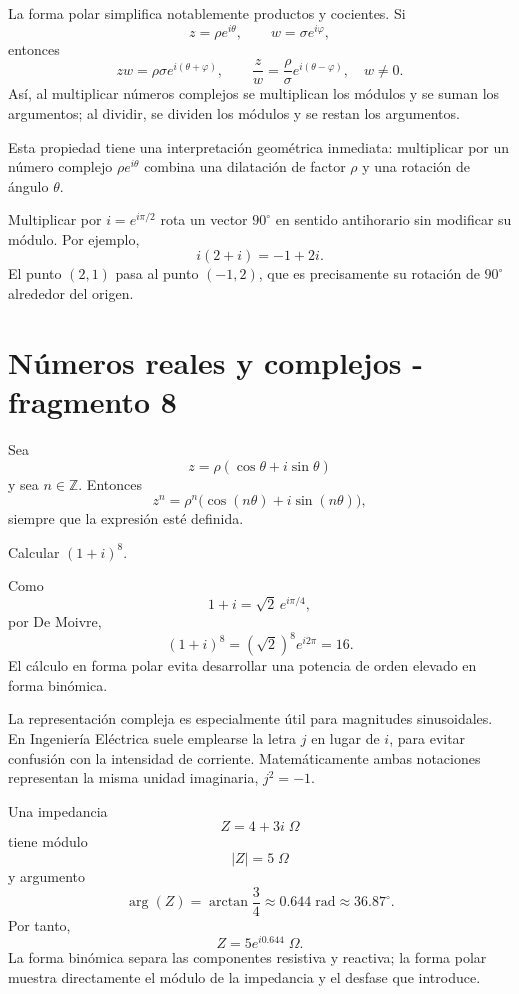 La forma polar simplifica notablemente productos y cocientes. Si
\[
z=\rho e^{i\theta},
\qquad
w=\sigma e^{i\varphi},
\]
entonces
\[
zw=\rho\sigma e^{i(\theta+\varphi)},
\qquad
\frac zw=\frac{\rho}{\sigma}e^{i(\theta-\varphi)},\quad w\neq0.
\]
Así, al multiplicar números complejos se multiplican los módulos y se suman los argumentos; al dividir, se dividen los módulos y se restan los argumentos.

Esta propiedad tiene una interpretación geométrica inmediata: multiplicar por un número complejo \(\rho e^{i\theta}\) combina una dilatación de factor \(\rho\) y una rotación de ángulo \(\theta\).

\begin{example}
Multiplicar por \(i=e^{i\pi/2}\) rota un vector \(90^\circ\) en sentido antihorario sin modificar su módulo. Por ejemplo,
\[
i(2+i)=-1+2i.
\]
El punto \((2,1)\) pasa al punto \((-1,2)\), que es precisamente su rotación de \(90^\circ\) alrededor del origen.
\end{example}


\section{Números reales y complejos - fragmento 8}
\begin{proposition}
Sea
\[
z=\rho(\cos\theta+i\sin\theta)
\]
y sea \(n\in\mathbb{Z}\). Entonces
\[
z^n=\rho^n\bigl(\cos(n\theta)+i\sin(n\theta)\bigr),
\]
siempre que la expresión esté definida.
\end{proposition}

\begin{example}
Calcular \((1+i)^8\).

Como
\[
1+i=\sqrt2\,e^{i\pi/4},
\]
por De Moivre,
\[
(1+i)^8=(\sqrt2)^8e^{i2\pi}=16.
\]
El cálculo en forma polar evita desarrollar una potencia de orden elevado en forma binómica.
\end{example}

La representación compleja es especialmente útil para magnitudes sinusoidales. En Ingeniería Eléctrica suele emplearse la letra \(j\) en lugar de \(i\), para evitar confusión con la intensidad de corriente. Matemáticamente ambas notaciones representan la misma unidad imaginaria, \(j^2=-1\).

\begin{example}
Una impedancia
\[
Z=4+3i\;\Omega
\]
tiene módulo
\[
|Z|=5\;\Omega
\]
y argumento
\[
\arg(Z)=\arctan\frac34\approx0.644\;\mathrm{rad}\approx36.87^\circ.
\]
Por tanto,
\[
Z=5e^{i0.644}\;\Omega.
\]
La forma binómica separa las componentes resistiva y reactiva; la forma polar muestra directamente el módulo de la impedancia y el desfase que introduce.
\end{example}

